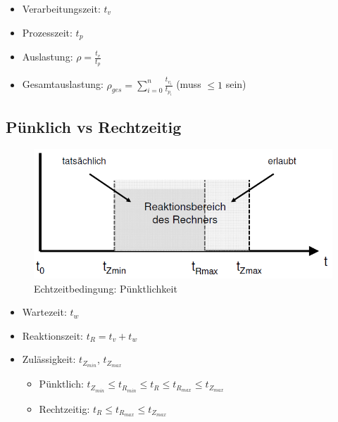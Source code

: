 \begin{itemize}
	\item Verarbeitungszeit: $t_v$
	\item Prozesszeit: $t_p$
	\item Auslastung: $\rho = \frac{t_v}{t_p}$
	\item Gesamtauslastung: $\rho_{ges} = \sum_{i=0}^{n}\frac{t_{v_i}}{t_{p_i}}$ (muss $\leq 1$ sein)
\end{itemize}

\subsection{Pünklich vs Rechtzeitig}
\begin{figure}[h!]
	\begin{center}
		\includegraphics[width=.75\linewidth]{pics/puenktlichkeit}
		\caption{Echtzeitbedingung: Pünktlichkeit}
	\end{center}
\end{figure}
\begin{itemize}
	\item Wartezeit: $t_w$
	\item Reaktionszeit: $t_R = t_v + t_w$
	\item Zulässigkeit: $t_{Z_{min}}$, $t_{Z_{max}}$
	\begin{itemize}
		\item Pünktlich: $t_{Z_{min}} \leq t_{R_{min}} \leq t_R \leq t_{R_{max}} \leq t_{Z_{max}}$
		\item Rechtzeitig: $t_R \leq t_{R_{max}} \leq t_{Z_{max}}$
	\end{itemize}
\end{itemize}